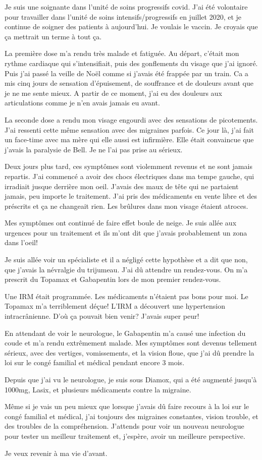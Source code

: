 Je suis une soignante dans l'unité de soins progressifs covid. J'ai été
volontaire pour travailler dans l'unité de soins intensifs/progressifs en
juillet 2020, et je continue de soigner des patients à aujourd'hui. Je voulais
le vaccin. Je croyais que ça mettrait un terme à tout ça.

La première dose m'a rendu très malade et fatiguée. Au départ, c'était mon
rythme cardiaque qui s'intensifiait, puis des gonflements du visage que j'ai
ignoré. Puis j'ai passé la veille de Noël comme si j'avais été frappée par un
train. Ca a mis cinq jours de sensation d'épuisement, de souffrance et de
douleurs avant que je ne me sente mieux. A partir de ce moment, j'ai eu des
douleurs aux articulations comme je n'en avais jamais eu avant.

La seconde dose a rendu mon visage engourdi avec des sensations de
picotements. J'ai ressenti cette même sensation avec des migraines parfois. Ce
jour là, j'ai fait un face-time avec ma mère qui elle aussi est infirmière. Elle
était convaincue que j'avais la paralysie de Bell. Je ne l'ai pas prise au
sérieux.

Deux jours plus tard, ces symptômes sont violemment revenus et ne sont jamais
repartis. J'ai commencé a avoir des chocs électriques dans ma tempe gauche, qui
irradiait jusque derrière mon oeil. J'avais des maux de tête qui ne partaient
jamais, peu importe le traitement. J'ai pris des médicaments en vente libre et
des préscrits et ça ne changeait rien. Les brûlures dans mon visage étaient
atroces.

Mes symptômes ont continué de faire effet boule de neige. Je suis allée aux
urgences pour un traitement et ils m'ont dit que j'avais probablement un zona
dans l'oeil!

Je suis allée voir un spécialiste et il a négligé cette hypothèse et a dit que
non, que j'avais la névralgie du trijumeau. J'ai dû attendre un rendez-vous. On
m'a prescrit du Topamax et Gabapentin lors de mon premier rendez-vous.

Une IRM était programmée. Les médicaments n'étaient pas bons pour moi. Le
Topamax m'a terriblement déçue! L'IRM a découvert une hypertension
intracrânienne. D'où ça pouvait bien venir? J'avais super peur!

En attendant de voir le neurologue, le Gabapentin m'a causé une infection du
coude et m'a rendu extrêmement malade. Mes symptômes sont devenus tellement
sérieux, avec des vertiges, vomissements, et la vision floue, que j'ai dû
prendre la loi sur le congé familial et médical pendant encore 3 mois.

Depuis que j'ai vu le neurologue, je suis sous Diamox, qui a été augmenté
jusqu'à 1000mg, Lasix, et plusieurs médicaments contre la migraine.

Même si je vais un peu mieux que lorsque j'avais dû faire recours à la loi sur
le congé familial et médical, j'ai toujours des migraines constantes, vision
trouble, et des troubles de la compréhension. J'attends pour voir un nouveau
neurologue pour tester un meilleur traitement et, j'espère, avoir un meilleure
perspective.

Je veux revenir à ma vie d'avant.
